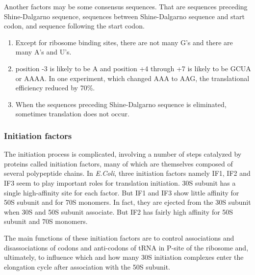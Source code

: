Another factors may be some consensus sequences. That are sequences 
preceding Shine-Dalgarno sequence,
sequences between Shine-Dalgarno sequence and start codon, and sequence
following the start codon. 
\begin{enumerate}
\item Except for ribosome binding sites, there are not many  G's and there are
many A's and U's.
\item position -3 is likely to be A and position +4 through +7 is
likely to be GCUA or AAAA. In one experiment, which changed AAA to AAG,
the translational efficiency reduced by 70\%\cite{label25}.
\item When the sequences preceding Shine-Dalgarno sequence is eliminated,
sometimes translation does not occur.

\end{enumerate}



 
\subsubsection{Initiation factors}
The initiation process is complicated, involving a number of steps catalyzed
by proteins called initiation factors, many of which are themselves
composed of several polypeptide chains. In {\it E.Coli}, three initiation 
factors namely IF1, IF2 and IF3 seem to play important roles for translation 
initiation. 30S subunit has a single high-affinity site for each factor.
But IF1 and IF3 show little affinity for 50S subunit and for 70S monomers.
In fact, they are ejected from the 30S subunit when 30S and 50S subunit
associate. But IF2 has fairly high affinity for 50S subunit and 70S monomers.

The main functions of these initiation factors are to control associations
and disassociations of codons and anti-codons of tRNA in P-site of the
ribosome and, ultimately, to influence which and how many 30S initiation 
complexes enter the elongation cycle after association with the 50S subunit.

